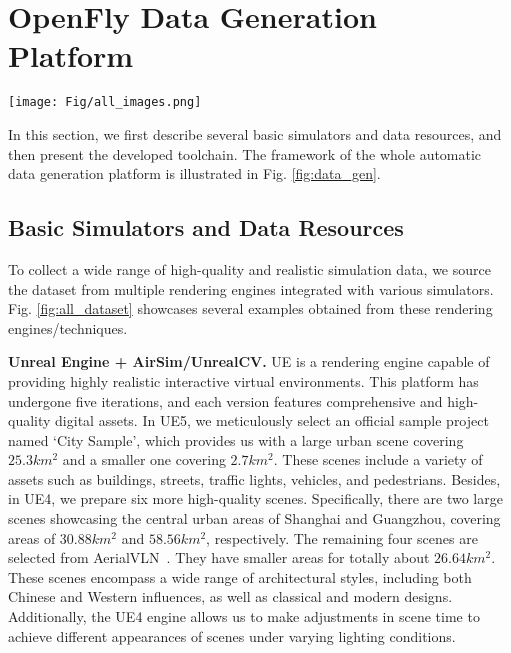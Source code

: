 \section{OpenFly Data Generation Platform}

\begin{figure*}[t]
\begin{center}
   \texttt{[image: Fig/all\_images.png]}
\end{center}
   \caption{High-quality examples from different rendering engines and techniques, including several large cities such as Shanghai, Guangzhou, Los Angeles, Osaka, and etc., cover an area of over a hundred square kilometers in total. 3D GS provides five large campus scenes, further enhancing the diversity and realism of the data.}
\label{fig:all_dataset}
\end{figure*}


In this section, we first describe several basic simulators and data resources, and then present the developed toolchain. The framework of the whole automatic data generation platform is illustrated in Fig. \ref{fig:data_gen}.

\subsection{Basic Simulators and Data Resources}
\label{sec:Automatic}


\indent \indent To collect a wide range of high-quality and realistic simulation data, we source the dataset from multiple rendering engines integrated with various simulators. Fig. \ref{fig:all_dataset} showcases several examples obtained from these rendering engines/techniques.

\textbf{Unreal Engine + AirSim/UnrealCV.} UE is a rendering engine capable of providing highly realistic interactive virtual environments. This platform has undergone five iterations, and each version features comprehensive and high-quality digital assets. In UE5, we meticulously select an official sample project named `City Sample', which provides us with a large urban scene covering $25.3 km^2$ and a smaller one covering $2.7 km^2$. These scenes include a variety of assets such as buildings, streets, traffic lights, vehicles, and pedestrians. Besides, in UE4, we prepare six more high-quality scenes. Specifically, there are two large scenes showcasing the central urban areas of Shanghai and Guangzhou, covering areas of $30.88 km^2$ and $58.56 km^2$, respectively. The remaining four scenes are selected from AerialVLN~\cite{aerialVLN}. They have smaller areas for totally about $26.64 km^2$. These scenes encompass a wide range of architectural styles, including both Chinese and Western influences, as well as classical and modern designs. Additionally, the UE4 engine allows us to make adjustments in scene time to achieve different appearances of scenes under varying lighting conditions.

